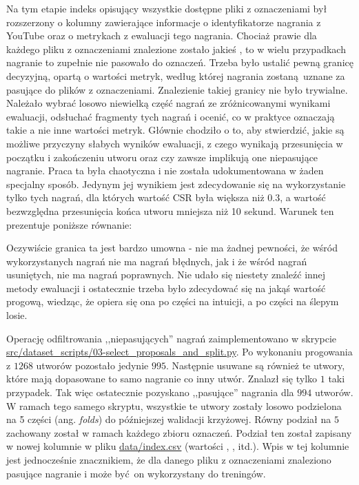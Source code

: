 Na tym etapie indeks opisujący wszystkie dostępne pliki z oznaczeniami był rozszerzony o kolumny zawierające informacje o identyfikatorze nagrania z YouTube oraz o metrykach z ewaluacji tego nagrania. Chociaż prawie dla każdego pliku z oznaczeniami znalezione zostało jakieś , to w wielu przypadkach nagranie to zupełnie nie pasowało do oznaczeń. Trzeba było ustalić pewną granicę decyzyjną, opartą o wartości metryk, według której nagrania zostaną uznane za pasujące do plików z oznaczeniami. Znalezienie takiej granicy nie było trywialne. Należało wybrać losowo niewielką część nagrań ze zróżnicowanymi wynikami ewaluacji, odsłuchać fragmenty tych nagrań i ocenić, co w praktyce oznaczają takie a nie inne wartości metryk. Głównie chodziło o to, aby stwierdzić, jakie są możliwe przyczyny słabych wyników ewaluacji, z czego wynikają przesunięcia w początku i zakończeniu utworu oraz czy zawsze implikują one niepasujące nagranie. Praca ta była chaotyczna i nie została udokumentowana w żaden specjalny sposób. Jedynym jej wynikiem jest zdecydowanie się na wykorzystanie tylko tych nagrań, dla których wartość CSR była większa niż 0.3, a wartość bezwzględna przesunięcia końca utworu mniejsza niż 10 sekund. Warunek ten prezentuje poniższe równanie:
\begin{center}
\end{center}
Oczywiście granica ta jest bardzo umowna - nie ma żadnej pewności, że wśród wykorzystanych nagrań nie ma nagrań błędnych, jak i że wśród nagrań usuniętych, nie ma nagrań poprawnych. Nie udało się niestety znaleźć innej metody ewaluacji i ostatecznie trzeba było zdecydować się na jakąś wartość progową, wiedząc, że opiera się ona po części na intuicji, a po części na ślepym losie.

Operację odfiltrowania ,,niepasujących'' nagrań zaimplementowano w skrypcie \url{src/dataset_scripts/03-select_proposals_and_split.py}. Po wykonaniu progowania z $1268$ utworów pozostało jedynie $995$. Następnie usuwane są również te utwory, które mają dopasowane to samo nagranie co inny utwór. Znalazł się tylko $1$ taki przypadek. Tak więc ostatecznie pozyskano ,,pasujące'' nagrania dla $994$ utworów. W ramach tego samego skryptu, wszystkie te utwory zostały losowo podzielona na 5 części (ang. \emph{folds}) do późniejszej walidacji krzyżowej. Równy podział na $5$ zachowany został w ramach każdego zbioru oznaczeń. Podział ten został zapisany w nowej kolumnie  w pliku \url{data/index.csv} (wartości , , itd.). Wpis w tej kolumnie jest jednocześnie znacznikiem, że dla danego pliku z oznaczeniami znaleziono pasujące nagranie i może być on wykorzystany do treningów.


